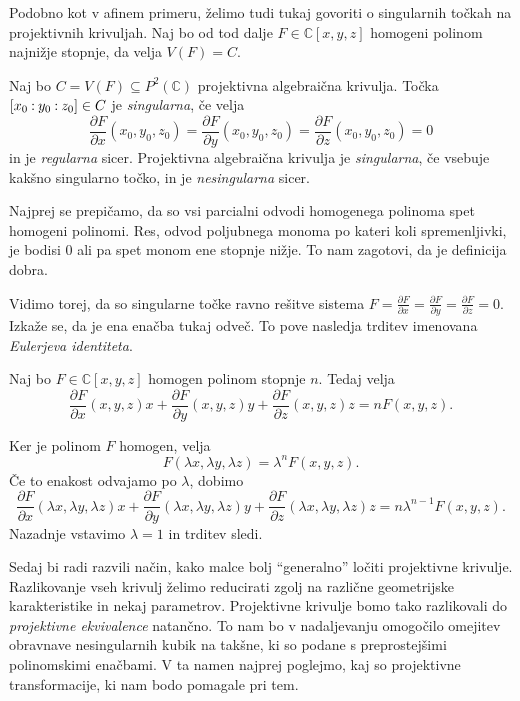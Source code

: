 \documentclass[mat1]{fmfdelo}
\newcommand{\C}{\mathbb C}
\newcommand{\PC}{P^2(\mathbb C)}
\newcommand{\Cxyz}{\C[x,y,z]}
\newcommand{\pcoor}[1]{%
\begingroup\lccode`~=`: \lowercase{\endgroup
\edef~}{\mathbin{\mathchar\the\mathcode`:}\nobreak}%
\left[%
\begingroup
\mathcode`:=\string"8000
#1%
\endgroup
\right]%
}
\newcommand{\pdv}[2][]{\frac{\partial#1}{\partial#2}}
\theoremstyle{definition}
\begin{document}
Podobno kot v afinem primeru, želimo tudi tukaj govoriti o singularnih točkah na projektivnih krivuljah. Naj bo od tod dalje $F \in \C[x,y,z]$ homogeni polinom najnižje stopnje, da velja $V(F) = C$.

\begin{definicija}
    Naj bo $C = V(F) \subseteq \PC$ projektivna algebraična krivulja. Točka $\pcoor{x_0:y_0:z_0} \in C$ je \emph{singularna}, če velja
    \[
        \pdv[F]{x}(x_0, y_0, z_0) = \pdv[F]{y}(x_0, y_0, z_0) = \pdv[F]{z}(x_0, y_0, z_0) = 0
    \]
    in je \emph{regularna} sicer. Projektivna algebraična krivulja je \emph{singularna}, če vsebuje kakšno singularno točko, in je \emph{nesingularna} sicer.
\end{definicija}

Najprej se prepičamo, da so vsi parcialni odvodi homogenega polinoma spet homogeni polinomi. Res, odvod poljubnega monoma po kateri koli spremenljivki, je bodisi $0$ ali pa spet monom ene stopnje nižje. To nam zagotovi, da je definicija dobra.

Vidimo torej, da so singularne točke ravno rešitve sistema $F = \pdv[F]{x}= \pdv[F]{y} = \pdv[F]{z} = 0$.
Izkaže se, da je ena enačba tukaj odveč. To pove nasledja trditev imenovana \emph{Eulerjeva identiteta}.

\begin{trditev}
    Naj bo $F \in \Cxyz$ homogen polinom stopnje $n$. Tedaj velja
    \[
        \pdv[F]{x}(x,y,z)x + \pdv[F]{y}(x,y,z)y + \pdv[F]{z}(x,y,z)z = nF(x,y,z). 
    \]
\end{trditev}

\begin{dokaz}
    Ker je polinom $F$ homogen, velja 
    $$ F(\lambda x, \lambda y, \lambda z) = \lambda^n F(x,y,z).$$
    Če to enakost odvajamo po $\lambda$, dobimo
    $$ \pdv[F]{x}(\lambda x,\lambda y,\lambda z)x + 
    \pdv[F]{y}(\lambda x,\lambda y,\lambda z) y + 
    \pdv[F]{z}(\lambda x,\lambda y,\lambda z) z = n\lambda^{n-1}F(x,y,z).$$
    Nazadnje vstavimo $\lambda = 1$ in trditev sledi.
\end{dokaz}

Sedaj bi radi razvili način, kako malce bolj ``generalno'' ločiti projektivne krivulje. Razlikovanje vseh krivulj želimo reducirati zgolj na različne geometrijske karakteristike in nekaj parametrov. 
Projektivne krivulje bomo tako razlikovali do \emph{projektivne ekvivalence} natančno. 
To nam bo v nadaljevanju omogočilo omejitev obravnave nesingularnih kubik na takšne, ki so podane s preprostejšimi polinomskimi enačbami.
V ta namen najprej poglejmo, kaj so projektivne transformacije, ki nam bodo pomagale pri tem.
\end{document}
